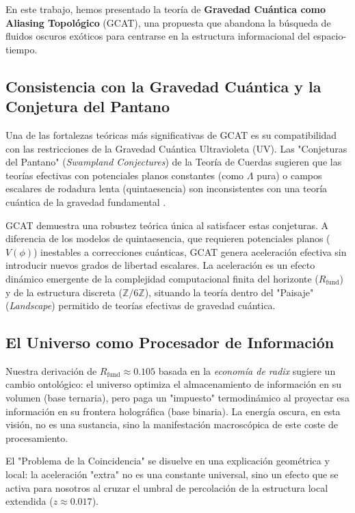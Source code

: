 \documentclass[12pt, a4paper]{article}
\theoremstyle{plain}
\theoremstyle{definition}
\begin{document}
En este trabajo, hemos presentado la teoría de \textbf{Gravedad Cuántica como Aliasing Topológico} (GCAT), una propuesta que abandona la búsqueda de fluidos oscuros exóticos para centrarse en la estructura informacional del espacio-tiempo.

\subsection{Consistencia con la Gravedad Cuántica y la Conjetura del Pantano}

Una de las fortalezas teóricas más significativas de GCAT es su compatibilidad con las restricciones de la Gravedad Cuántica Ultravioleta (UV). Las "Conjeturas del Pantano" (\textit{Swampland Conjectures}) de la Teoría de Cuerdas sugieren que las teorías efectivas con potenciales planos constantes (como $\Lambda$ pura) o campos escalares de rodadura lenta (quintaesencia) son inconsistentes con una teoría cuántica de la gravedad fundamental \cite{Palti2019}.

GCAT demuestra una robustez teórica única al satisfacer estas conjeturas. A diferencia de los modelos de quintaesencia, que requieren potenciales planos ($V(\phi)$) inestables a correcciones cuánticas, GCAT genera aceleración efectiva sin introducir nuevos grados de libertad escalares. La aceleración es un efecto dinámico emergente de la complejidad computacional finita del horizonte ($R_{\text{fund}}$) y de la estructura discreta ($\mathbb{Z}/6\mathbb{Z}$), situando la teoría dentro del "Paisaje" (\textit{Landscape}) permitido de teorías efectivas de gravedad cuántica.

\subsection{El Universo como Procesador de Información}

Nuestra derivación de $R_{\text{fund}} \approx 0.105$ basada en la \textit{economía de radix} sugiere un cambio ontológico: el universo optimiza el almacenamiento de información en su volumen (base ternaria), pero paga un "impuesto" termodinámico al proyectar esa información en su frontera holográfica (base binaria). La energía oscura, en esta visión, no es una sustancia, sino la manifestación macroscópica de este coste de procesamiento.

El "Problema de la Coincidencia" se disuelve en una explicación geométrica y local: la aceleración "extra" no es una constante universal, sino un efecto que se activa para nosotros al cruzar el umbral de percolación de la estructura local extendida (\textbf{$z \approx 0.017$}).
\end{document}
